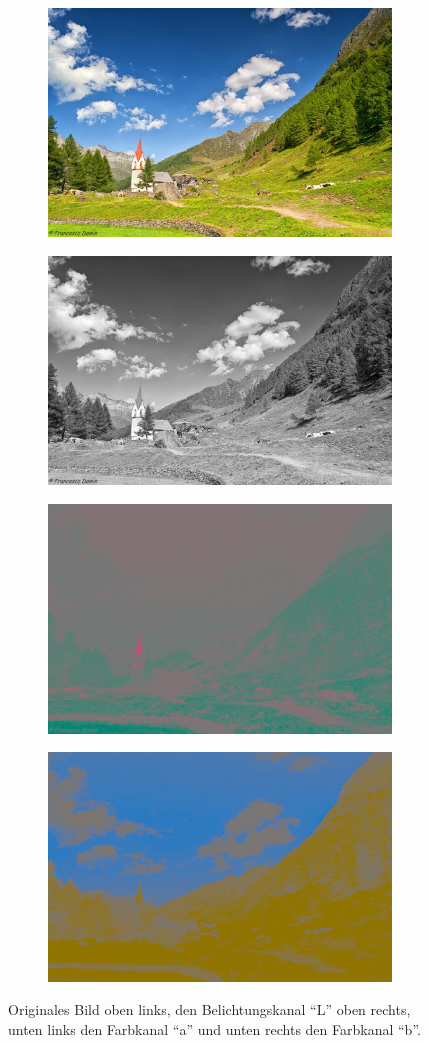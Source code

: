 \begin{figure}[H]
  \vspace{1cm}
  \begin{subfigure}
    \centering
    \includegraphics[width=.5\textwidth]{resources/colorspace/image.jpg}
  \end{subfigure}
  \begin{subfigure}
    \centering
    \includegraphics[width=.5\textwidth]{resources/colorspace/grayscale.png}
  \end{subfigure}
  \begin{subfigure}
    \centering
    \includegraphics[width=.5\textwidth]{resources/colorspace/a_channel.png}
  \end{subfigure}
  \begin{subfigure}
    \centering
    \includegraphics[width=.5\textwidth]{resources/colorspace/b_channel.png}
  \end{subfigure}
  \caption{Originales Bild oben links, den Belichtungskanal ``L'' oben rechts, unten links den Farbkanal ``a'' und unten rechts den Farbkanal ``b''.}
  \label{image:farbraum}
\end{figure}

